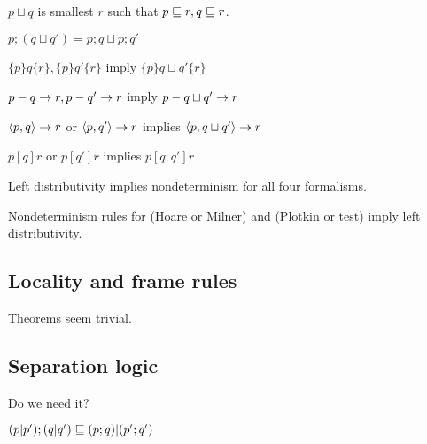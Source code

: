 \documentclass{article}
\begin{document}
\begin{definition}[$\sqcup$]
$p \sqcup q$ is smallest $r$ such that $p \sqsubseteq r, q \sqsubseteq r$.
\end{definition}

\begin{law}
$p; (q \sqcup q') = p;q \sqcup p;q'$
\end{law}

\begin{rul}
$\{p\}q\{r\}, \{p\}q'\{r\}$ imply $\{p\}q\sqcup q'\{r\}$
\end{rul}

\begin{rul}
$p-q\rightarrow r, p-q'\rightarrow r$ imply $p-q\sqcup q'\rightarrow r$
\end{rul}

\begin{rul}
$\left< p, q \right> \rightarrow r$ or $\left< p, q' \right> \rightarrow r$ implies $\left< p, q\sqcup q' \right> \rightarrow r$
\end{rul}

\begin{rul}
$p [q] r$ or $p [q'] r$ implies $p [q;q'] r$
\end{rul}

\begin{theorem}
Left distributivity implies nondeterminism for all four formalisms.
\end{theorem}


\begin{theorem}
Nondeterminism rules for (Hoare or Milner) and (Plotkin or test) 
imply left distributivity.
\end{theorem}


\subsection*{Locality and frame rules}
Theorems seem trivial.

\subsection*{Separation logic}

\begin{axiom}
\end{axiom}

Do we need it?

\begin{law}[Exchange]
$(p|p');(q|q') \sqsubseteq (p;q)|(p';q')$
\end{law}
\end{document}
